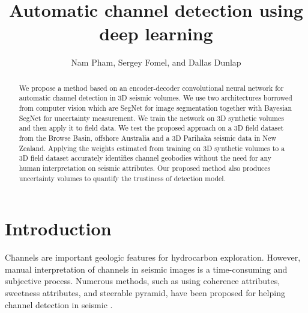 
\title{Automatic channel detection using deep learning}
\author{Nam Pham, Sergey Fomel, and Dallas Dunlap}
\address{The University of Texas at Austin,\\
John A. and Katherine G. Jackson School of Geosciences,\\ Bureau of Economic Geology,\\
Austin, Texas, USA}




\maketitle
\begin{abstract}
We propose a method based on an encoder-decoder convolutional neural network for automatic channel detection in 3D seismic volumes. We use two architectures borrowed from computer vision which are SegNet for image segmentation together with Bayesian SegNet for uncertainty measurement. We train the network on 3D synthetic volumes and then apply it to field data. We test the proposed approach on a 3D field dataset from the Browse Basin, offshore Australia and a 3D Parihaka seismic data in New Zealand. Applying the weights estimated from training on 3D synthetic volumes to a 3D field dataset accurately identifies channel geobodies without the need for any human interpretation on seismic attributes. Our proposed method also produces uncertainty volumes to quantify the trustiness of detection model.  
\end{abstract}

\section{Introduction}
Channels are important geologic features for hydrocarbon exploration. However, manual interpretation of channels in seismic images is a time-consuming and subjective process. Numerous methods, such as using coherence attributes, sweetness attributes, and steerable pyramid, have been proposed for helping channel detection in seismic \cite[]{coherence, sweetness, pyramid}. 

